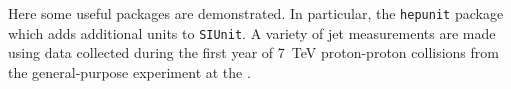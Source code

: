 Here some useful packages are demonstrated.
In particular, the \texttt{hepunit} package which adds additional units to \texttt{SIUnit}.
A variety of jet measurements are made using data collected during the first year of \SI{7}{\TeV} proton-proton collisions from the general-purpose \ATLAS experiment at the \LHC.

